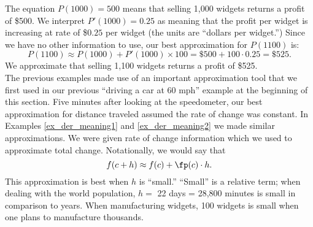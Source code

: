 {\enlargethispage{2\baselineskip}
The equation $P(1000)=500$ means that selling 1,000 widgets returns a profit of \$500. We interpret $P'(1000) = 0.25$ as meaning that the profit per widget is increasing at rate of \$$0.25$ per widget (the units are ``dollars per widget.'') Since we have no other information to use, our best approximation for $P(1100)$ is:
	$$P(1100) \approx P(1000) + P'(1000)\times100 = \text{\$500} + 100\cdot0.25 = \text{\$525.}$$
We approximate that selling 1,100 widgets returns a profit of \$525.
}\\

The previous examples made use of an important approximation tool that we first used in our previous ``driving a car at 60 mph'' example at the beginning of this section. Five minutes after looking at the speedometer, our best approximation for distance traveled assumed the rate of change was constant. In Examples \ref{ex_der_meaning1} and \ref{ex_der_meaning2} we made similar approximations. We were given rate of change information which we used to approximate total change. Notationally, we would say that 
	$$f(c+h) \approx f(c) + \fp(c)\cdot h.$$ This approximation is best when $h$ is ``small.'' ``Small'' is a relative term; when dealing with the world population, $h=$ 22 days = 28,800 minutes is small in comparison to years. When manufacturing widgets, 100 widgets is small when one plans to manufacture thousands. \\


